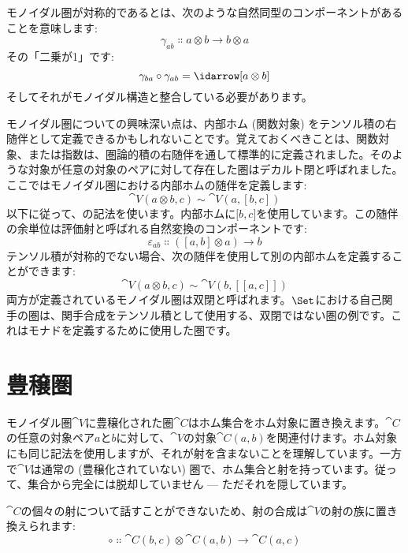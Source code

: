 \begin{figure}[H]
  \centering
\end{figure}

\noindent
モノイダル圏が対称的であるとは、次のような自然同型のコンポーネントがあることを意味します: 
\[\gamma_{a b} \Colon a \otimes b \to b \otimes a\]
その「二乗が1」です: 
\[\gamma_{b a} \circ \gamma_{a b} = \idarrow[a \otimes b]\]
そしてそれがモノイダル構造と整合している必要があります。

モノイダル圏についての興味深い点は、内部ホム (関数対象) をテンソル積の右随伴として定義できるかもしれないことです。覚えておくべきことは、関数対象、または指数は、圏論的積の右随伴を通して標準的に定義されました。そのような対象が任意の対象のペアに対して存在した圏はデカルト閉と呼ばれました。ここではモノイダル圏における内部ホムの随伴を定義します: 
\[\cat{V}(a \otimes b, c) \sim \cat{V}(a, [b, c])\]
以下に従って、の記法を使います。内部ホムに${[}b, c{]}$を使用しています。この随伴の余単位は評価射と呼ばれる自然変換のコンポーネントです: 
\[\varepsilon_{a b} \Colon ([a, b] \otimes a) \to b\]
テンソル積が対称的でない場合、次の随伴を使用して別の内部ホムを定義することができます: 
\[\cat{V}(a \otimes b, c) \sim \cat{V}(b, [[a, c]])\]
両方が定義されているモノイダル圏は双閉と呼ばれます。$\Set$における自己関手の圏は、関手合成をテンソル積として使用する、双閉ではない圏の例です。これはモナドを定義するために使用した圏です。

\section{豊穣圏}

モノイダル圏$\cat{V}$に豊穣化された圏$\cat{C}$はホム集合をホム対象に置き換えます。$\cat{C}$の任意の対象ペア$a$と$b$に対して、$\cat{V}$の対象$\cat{C}(a, b)$を関連付けます。ホム対象にも同じ記法を使用しますが、それが射を含まないことを理解しています。一方で$\cat{V}$は通常の (豊穣化されていない) 圏で、ホム集合と射を持っています。従って、集合から完全には脱却していません --- ただそれを隠しています。

$\cat{C}$の個々の射について話すことができないため、射の合成は$\cat{V}$の射の族に置き換えられます: 
\[\circ \Colon \cat{C}(b, c) \otimes \cat{C}(a, b) \to \cat{C}(a, c)\]

